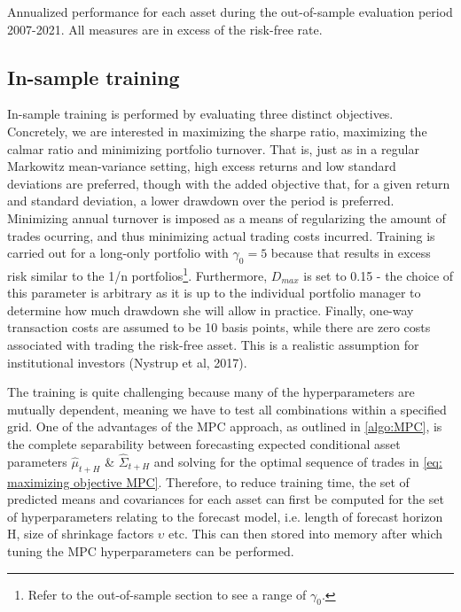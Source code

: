 \begin{table}[H]
\small
\centering
\caption[Annualized
performance for each asset during the out-of-sample period]{Annualized
performance for each asset during the out-of-sample evaluation period 2007-2021. All measures are in excess of the risk-free rate.}

\label{tab:MPC_asset_performance}
\end{table}

\subsection{In-sample training}

In-sample training is performed by evaluating three distinct objectives. Concretely, we are interested in maximizing the sharpe ratio, maximizing the calmar ratio and minimizing portfolio turnover. That is, just as in a regular Markowitz mean-variance setting, high excess returns and low standard deviations are preferred, though with the added objective that, for a given return and standard deviation, a lower drawdown over the period is preferred. Minimizing annual turnover is imposed as a means of regularizing the amount of trades ocurring, and thus minimizing actual trading costs incurred. Training is carried out for a long-only portfolio with $\gamma_0=5$ because that results in excess risk similar to the 1/n portfolios\footnote
{Refer to the out-of-sample section to see a range of $\gamma_0$.
}. Furthermore, $D_{max}$ is set to 0.15 - the choice of this parameter is arbitrary as it is up to the individual portfolio manager to determine how much drawdown she will allow in practice. Finally, one-way transaction costs are assumed to be 10 basis points, while there are zero costs associated with trading the risk-free asset. This is a realistic assumption for institutional investors (Nystrup et al, 2017).

The training is quite challenging because many of the hyperparameters are mutually dependent, meaning we have to test all combinations within a specified grid. One of the advantages of the MPC approach, as outlined in \cref{algo:MPC}, is the complete separability between forecasting expected conditional asset parameters $\hat\mu_{t+H}$ \& $\hat\Sigma_{t+H}$ and solving for the optimal sequence of trades in \cref{eq: maximizing objective MPC}. Therefore, to reduce training time, the set of predicted means and covariances for each asset can first be computed for the set of hyperparameters relating to the forecast model, i.e. length of forecast horizon H, size of shrinkage factors $\upsilon$ etc. This can then stored into memory after which tuning the MPC hyperparameters can be performed.

